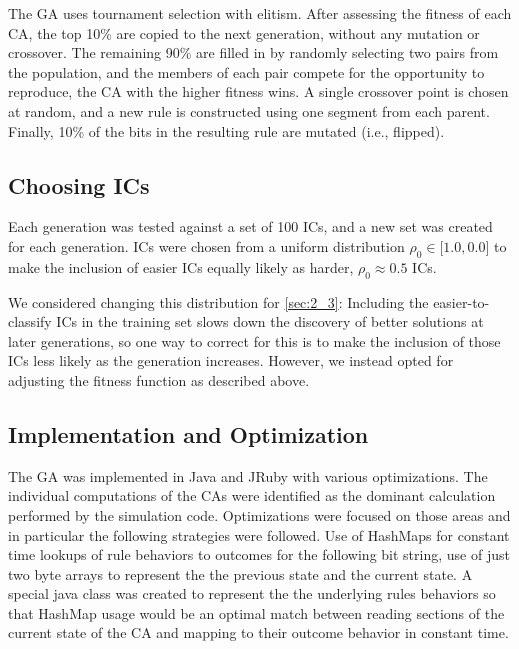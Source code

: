The GA uses tournament selection with elitism. After assessing the fitness of each CA, the top 10\% are copied to the next generation, 
without any mutation or crossover. The remaining 90\% are filled in by randomly selecting two pairs from the population, and the members of 
each pair compete for the opportunity to reproduce, the CA with the higher fitness wins. A single crossover point is chosen at random, 
and a new rule is constructed using one segment from each parent. Finally, 10\% of the bits in the resulting rule are mutated (i.e., flipped).

\subsection{Choosing ICs}

Each generation was tested against a set of 100 ICs, and a new set was created for each generation. ICs were chosen 
from a uniform distribution $\rho_0 \in \lbrack1.0, 0.0\rbrack$ to make the inclusion of easier ICs equally likely as 
harder, $\rho_0 \approx 0.5$ ICs.

We considered changing this distribution for \ref{sec:2_3}: Including the easier-to-classify ICs in the training set 
slows down the discovery of better solutions at later generations, so one way to correct for this is to make the inclusion of 
those ICs less likely as the generation increases. However, we instead opted for adjusting the fitness function as described 
above.

\subsection{Implementation and Optimization}

The GA was implemented in Java and JRuby with various optimizations. The individual computations of the CAs were identified as the dominant calculation performed by the simulation code. Optimizations were focused on those areas and in particular the following strategies were followed. Use of HashMaps for constant time lookups of rule behaviors to outcomes for the following bit string, use of just two byte arrays to represent the the previous state and the current state. A special java class was created to represent the the underlying rules behaviors so that HashMap usage would be an optimal match between reading sections of the current state of the CA and mapping to their outcome behavior in constant time.


